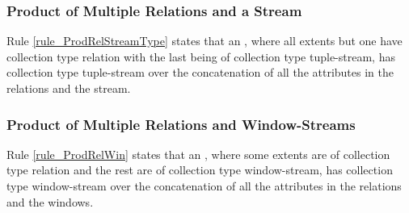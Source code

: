 \subsubsection{Product of Multiple Relations and a Stream}

Rule \ref{rule_ProdRelStreamType} states that an ,
where all extents but one have collection type relation with the last
being of collection type tuple-stream, has collection type tuple-stream
over the concatenation of all the attributes in the relations and the
stream.


\subsubsection{Product of Multiple Relations and Window-Streams}

Rule \ref{rule_ProdRelWin} states that an , where some
extents are of collection type relation and the rest are of collection
type window-stream, has collection type window-stream over the
concatenation of all the attributes in the relations and the windows.


